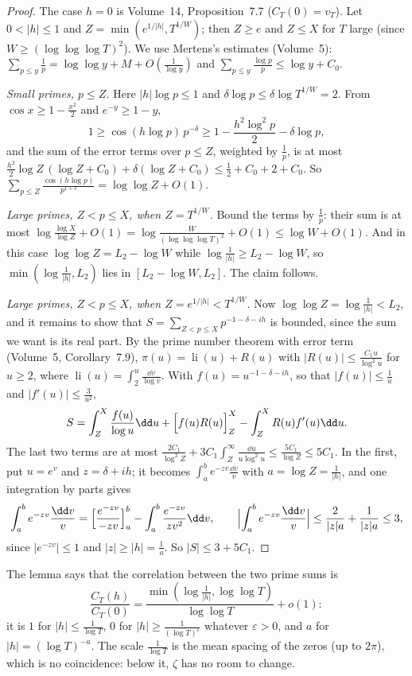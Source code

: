 \begin{proof}
The case $h=0$ is Volume~14, Proposition~7.7 ($C_T(0)=v_T$). Let $0<|h|\le1$ and $Z=\min(e^{1/|h|},T^{1/W})$; then $Z\ge e$ and $Z\le X$ for $T$ large (since $W\ge(\log\log\log T)^2$). We use Mertens's estimates (Volume~5): $\sum_{p\le y}\frac1p=\log\log y+M+O(\frac1{\log y})$ and $\sum_{p\le y}\frac{\log p}p\le\log y+C_0$.

\emph{Small primes, $p\le Z$.} Here $|h|\log p\le1$ and $\delta\log p\le\delta\log T^{1/W}=2$. From $\cos x\ge1-\frac{x^2}2$ and $e^{-y}\ge1-y$,
\[
1\ge\cos(h\log p)\,p^{-\delta}\ge1-\frac{h^2\log^2p}2-\delta\log p,
\]
and the sum of the error terms over $p\le Z$, weighted by $\frac1p$, is at most $\frac{h^2}2\log Z\,(\log Z+C_0)+\delta(\log Z+C_0)\le\frac12+C_0+2+C_0$. So $\sum_{p\le Z}\frac{\cos(h\log p)}{p^{1+\delta}}=\log\log Z+O(1)$.

\emph{Large primes, $Z<p\le X$, when $Z=T^{1/W}$.} Bound the terms by $\frac1p$: their sum is at most $\log\frac{\log X}{\log Z}+O(1)=\log\frac W{(\log\log\log T)^2}+O(1)\le\log W+O(1)$. And in this case $\log\log Z=L_2-\log W$ while $\log\frac1{|h|}\ge L_2-\log W$, so $\min(\log\frac1{|h|},L_2)$ lies in $[L_2-\log W,L_2]$. The claim follows.

\emph{Large primes, $Z<p\le X$, when $Z=e^{1/|h|}<T^{1/W}$.} Now $\log\log Z=\log\frac1{|h|}<L_2$, and it remains to show that $S=\sum_{Z<p\le X}p^{-1-\delta-ih}$ is bounded, since the sum we want is its real part. By the prime number theorem with error term (Volume~5, Corollary~7.9), $\pi(u)=\operatorname{li}(u)+R(u)$ with $|R(u)|\le\frac{C_1u}{\log^2u}$ for $u\ge2$, where $\operatorname{li}(u)=\int_2^u\frac{\dd v}{\log v}$. With $f(u)=u^{-1-\delta-ih}$, so that $|f(u)|\le\frac1u$ and $|f'(u)|\le\frac3{u^2}$,
\[
S=\int_Z^X\frac{f(u)}{\log u}\dd u+\Bigl[f(u)R(u)\Bigr]_Z^X-\int_Z^XR(u)f'(u)\dd u .
\]
The last two terms are at most $\frac{2C_1}{\log^2Z}+3C_1\int_Z^\infty\frac{\dd u}{u\log^2u}\le\frac{5C_1}{\log Z}\le5C_1$. In the first, put $u=e^v$ and $z=\delta+ih$; it becomes $\int_a^be^{-zv}\frac{\dd v}v$ with $a=\log Z=\frac1{|h|}$, and one integration by parts gives
\[
\int_a^be^{-zv}\frac{\dd v}v=\Bigl[\frac{e^{-zv}}{-zv}\Bigr]_a^b-\int_a^b\frac{e^{-zv}}{zv^2}\dd v,\qquad\Bigl|\int_a^be^{-zv}\frac{\dd v}v\Bigr|\le\frac2{|z|a}+\frac1{|z|a}\le3,
\]
since $|e^{-zv}|\le1$ and $|z|\ge|h|=\frac1a$. So $|S|\le3+5C_1$.
\end{proof}

The lemma says that the correlation between the two prime sums is
\[
\frac{C_T(h)}{C_T(0)}=\frac{\min(\log\frac1{|h|},\log\log T)}{\log\log T}+o(1):
\]
it is $1$ for $|h|\le\frac1{\log T}$, $0$ for $|h|\ge\frac1{(\log T)^{\varepsilon}}$ whatever $\varepsilon>0$, and $a$ for $|h|=(\log T)^{-a}$. The scale $\frac1{\log T}$ is the mean spacing of the zeros (up to $2\pi$), which is no coincidence: below it, $\zeta$ has no room to change.

